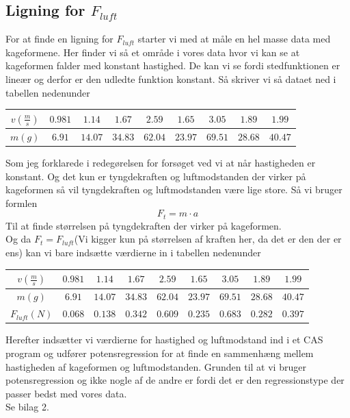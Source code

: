 \documentclass[12pt]{article}
\begin{document}
\subsection{Ligning for $F_{luft}$}
For at finde en ligning for $F_{luft}$ starter vi med at måle en hel masse data
med kageformene. Her finder vi så et område i vores data hvor vi kan se at kageformen
falder med konstant hastighed. De kan vi se fordi stedfunktionen er lineær og derfor er
den udledte funktion konstant. Så skriver vi så dataet ned i tabellen nedenunder
\begin{center}
  \begin{tabular}{| c | c | c | c | c | c | c | c | c |}
        \hline
        $v(\frac{m}{s})$ & $0.981$ & $1.14$ & $1.67$ & $2.59$ & $1.65$ & $3.05$ & $1.89$ & $1.99$ \\
        \hline
        $m(g)$ & $6.91$ & $14.07$ & $34.83$ & $62.04$ & $23.97$ & $69.51$ & $28.68$ & $40.47$ \\
        \hline
  \end{tabular}
\end{center}

Som jeg forklarede i redegørelsen for forsøget ved vi at når hastigheden er konstant. Og det kun er tyngdekraften og luftmodstanden der virker på kageformen
så vil tyngdekraften og luftmodstanden være lige store. Så vi bruger formlen
$$F_{t}=m \cdot a$$
Til at finde størrelsen på tyngdekraften der virker på kageformen. \\
Og da $F_{t}=F_{luft}$(Vi kigger kun på størrelsen af kraften her, da det er den der er ens)
kan vi bare indsætte værdierne in i tabellen nedenunder
\begin{center}
  \begin{tabular}{| c | c | c | c | c | c | c | c | c |}
        \hline
        $v(\frac{m}{s})$ & $0.981$ & $1.14$ & $1.67$ & $2.59$ & $1.65$ & $3.05$ & $1.89$ & $1.99$ \\
        \hline
        $m(g)$ & $6.91$ & $14.07$ & $34.83$ & $62.04$ & $23.97$ & $69.51$ & $28.68$ & $40.47$ \\
        \hline
        $F_{luft}(N)$ & $0.068$ & $0.138$ & $0.342$ & $0.609$ & $0.235$ & $0.683$ & $0.282$ & $0.397$ \\
        \hline
  \end{tabular}
\end{center}

Herefter indsætter vi værdierne for hastighed og luftmodstand ind i et CAS program og udfører potensregression for at finde en sammenhæng mellem
hastigheden af kageformen og luftmodstanden. Grunden til at vi bruger potensregression og ikke nogle af de andre er fordi det er den regressionstype der passer bedst med vores data.\\
Se bilag 2.
\end{document}
